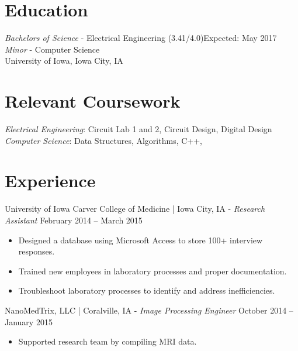 \documentclass[letter]{res}
\begin{document}
\address{ (507)-403-1634 \\}
\address{
  \texttt{bryan-ehlers@uiowa.edu}\\ } 
\begin{resume}
  \noindent\makebox[\linewidth]{\rule{\paperwidth}{0.4pt}}

\section{Education}
{\sl Bachelors of Science} - Electrical Engineering (3.41/4.0)\hfill Expected: May 2017\\
{\sl Minor} - Computer Science \\
University of Iowa,  Iowa City, IA
  \vspace{-2mm}
\section{Relevant Coursework}
  {\sl Electrical Engineering}: Circuit Lab 1 and 2, Circuit Design, Digital Design\\
  {\sl Computer Science}: Data Structures, Algorithms, C++, 

\section{Experience}
University of Iowa Carver College of Medicine | Iowa City, IA \newline
 - {\sl Research Assistant} \hfill February 2014 – March 2015\\
 \vspace{-2mm}
 \begin{itemize}
 \item Designed a database using Microsoft Access to store 100+ interview responses.
 \item Trained new employees in laboratory processes and proper documentation.
 \item Troubleshoot laboratory processes to identify and address inefficiencies.
 \end{itemize}
   \vspace{-2mm}

NanoMedTrix, LLC | Coralville, IA \newline - {\sl Image Processing Engineer} \hfill October 2014 – January 2015\\
  \vspace{-2mm}
  \begin{itemize}
  \item Supported research team by compiling MRI data. 
  \end{itemize}
    \vspace{-2mm}


\end{resume}
\end{document}
